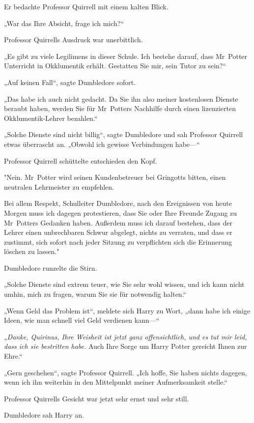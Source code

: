 {Er bedachte Professor Quirrell mit einem kalten Blick.

„War das Ihre Absicht, frage ich mich?“

Professor Quirrells Ausdruck war unerbittlich.

„Es gibt zu viele Legilimens in dieser Schule. Ich bestehe darauf, dass Mr~Potter Unterricht in Okklumentik erhält. Gestatten Sie mir, sein Tutor zu sein?“

„Auf keinen Fall“, sagte Dumbledore sofort.

„Das habe ich auch nicht gedacht. Da Sie ihn also meiner kostenlosen Dienste beraubt haben, werden Sie für Mr~Potters Nachhilfe durch einen lizenzierten Okklumentik-Lehrer bezahlen.“

„Solche Dienste sind nicht billig“, sagte Dumbledore und sah Professor Quirrell etwas überrascht an. „Obwohl ich gewisse Verbindungen habe—“

Professor Quirrell schüttelte entschieden den Kopf.

"Nein. Mr~Potter wird seinen Kundenbetreuer bei Gringotts bitten, einen neutralen Lehrmeister zu empfehlen.

Bei allem Respekt, Schulleiter Dumbledore, nach den Ereignissen von heute Morgen muss ich dagegen protestieren, dass Sie oder Ihre Freunde Zugang zu Mr~Potters Gedanken haben. Außerdem muss ich darauf bestehen, dass der Lehrer einen unbrechbaren Schwur abgelegt, nichts zu verraten, und dass er zustimmt, sich sofort nach jeder Sitzung zu verpflichten sich die Erinnerung löschen zu lassen."

Dumbledore runzelte die Stirn.

„Solche Dienste sind extrem teuer, wie Sie sehr wohl wissen, und ich kann nicht umhin, mich zu fragen, warum Sie sie für notwendig halten.“

„Wenn Geld das Problem ist“, meldete sich Harry zu Wort, „dann habe ich einige Ideen, wie man schnell viel Geld verdienen kann—“

„\emph{Danke, Quirinus, Ihre Weisheit ist jetzt ganz offensichtlich, und es tut mir leid, dass ich sie bestritten habe.} Auch Ihre Sorge um Harry Potter gereicht Ihnen zur Ehre.“

„Gern geschehen“, sagte Professor Quirrell. „Ich hoffe, Sie haben nichts dagegen, wenn ich ihn weiterhin in den Mittelpunkt meiner Aufmerksamkeit stelle.“

Professor Quirrells Gesicht war jetzt sehr ernst und sehr still.

Dumbledore sah Harry an.

}
